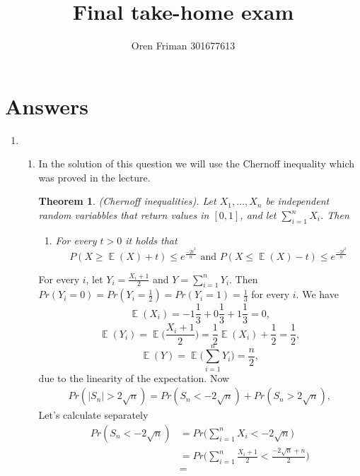 \documentclass[a4paper, 11pt, oneside]{article}
\newtheorem{theorem}{Theorem}[section]
\newcommand\abs[1]{\left|#1\right|}
\DeclareMathOperator{\EX}{\mathbb{E}}
\begin{document}
\title{Final take-home exam}
\author{Oren Friman 301677613}
\maketitle
				   
\section{Answers}
\begin{enumerate}
\item
 \begin{enumerate}
\item  In the solution of this question we will use the Chernoff inequality which was proved in the lecture.
\begin{theorem} (Chernoff inequalities). Let $X_1,\ldots,X_n$ be independent random variabbles that return values in $[0,1]$, and let $\sum_{i=1}^nX_i$. Then
 \begin{enumerate}
 \item For every $t>0$ it holds that
 \begin{equation*}
P(X\geq\EX(X)+t) \leq e^{\frac{-2t^2}{n}}\text{ and } P(X\leq\EX(X)-t) \leq e^{\frac{-2t^2}{n}}
\end{equation*}
 \end{enumerate}
\end{theorem}
For every $i$, let $Y_i = \frac{X_i+1}{2}$ and $Y = \sum_{i=1}^nY_i$. Then $Pr(Y_i=0) = Pr(Y_i=\frac{1}{2}) = Pr(Y_i=1) = \frac{1}{3}$ for every $i$. We have
  \begin{equation}\label{ex}
 \EX(X_i) = -1 \frac{1}{3} + 0 \frac{1}{3} + 1 \frac{1}{3} = 0,
 \end{equation}
\begin{equation*}
 \EX(Y_i) = \EX\bigg(\frac{X_i + 1}{2}\bigg) = \frac{1}{2}\EX(X_i)+\frac{1}{2} = \frac{1}{2},
 \end{equation*}
  \begin{equation*}
 \EX(Y) = \EX\bigg(\sum^n_{i=1}Y_i\bigg) = \frac{n}{2},
 \end{equation*}
due to the linearity of the expectation. Now
\begin{align*}
Pr(\abs{S_n}>2\sqrt{n}) = Pr(S_n<-2\sqrt{n}) + Pr(S_n>2\sqrt{n}),
\end{align*}
Let's calculate separately
\begin{align*}
 Pr(S_n<-2\sqrt{n}) &=
 Pr\bigg(\sum_{i=1}^nX_i<-2\sqrt{n}\bigg) \\&=
 Pr\bigg(\sum_{i=1}^n\frac{X_i+1}{2}<\frac{-2\sqrt{n}+n}{2}\bigg)\\&=

\end{align*}
\end{enumerate}
\end{enumerate}
\end{document}
